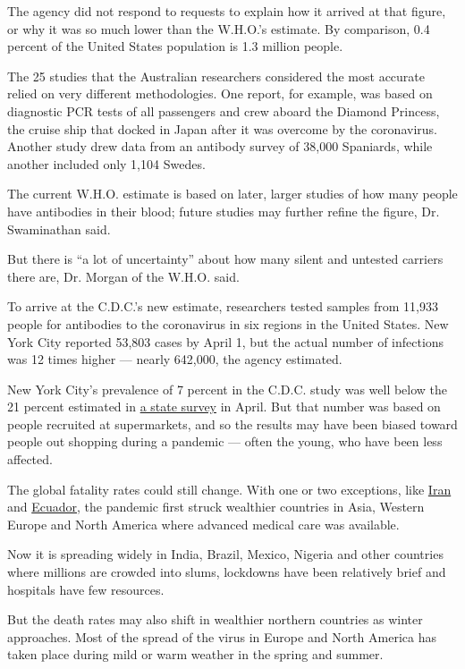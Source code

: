 The agency did not respond to requests to explain how it arrived at that
figure, or why it was so much lower than the W.H.O.'s estimate. By
comparison, 0.4 percent of the United States population is 1.3 million
people.

The 25 studies that the Australian researchers considered the most
accurate relied on very different methodologies. One report, for
example, was based on diagnostic PCR tests of all passengers and crew
aboard the Diamond Princess, the cruise ship that docked in Japan after
it was overcome by the coronavirus. Another study drew data from an
antibody survey of 38,000 Spaniards, while another included only 1,104
Swedes.

The current W.H.O. estimate is based on later, larger studies of how
many people have antibodies in their blood; future studies may further
refine the figure, Dr. Swaminathan said.

But there is ``a lot of uncertainty'' about how many silent and untested
carriers there are, Dr. Morgan of the W.H.O. said.

To arrive at the C.D.C.'s new estimate, researchers tested samples from
11,933 people for antibodies to the coronavirus in six regions in the
United States. New York City reported 53,803 cases by April 1, but the
actual number of infections was 12 times higher --- nearly 642,000, the
agency estimated.

New York City's prevalence of 7 percent in the C.D.C. study was well
below the 21 percent estimated in
\href{https://www.sciencedirect.com/science/article/pii/S1047279720302015}{a
state survey} in April. But that number was based on people recruited at
supermarkets, and so the results may have been biased toward people out
shopping during a pandemic --- often the young, who have been less
affected.

The global fatality rates could still change. With one or two
exceptions, like
\href{https://www.nytimes.com/2020/05/18/world/middleeast/iran-coronavirus-surge.html}{Iran}
and
\href{https://www.nytimes.com/2020/04/23/world/americas/ecuador-deaths-coronavirus.html}{Ecuador},
the pandemic first struck wealthier countries in Asia, Western Europe
and North America where advanced medical care was available.

Now it is spreading widely in India, Brazil, Mexico, Nigeria and other
countries where millions are crowded into slums, lockdowns have been
relatively brief and hospitals have few resources.

But the death rates may also shift in wealthier northern countries as
winter approaches. Most of the spread of the virus in Europe and North
America has taken place during mild or warm weather in the spring and
summer.

